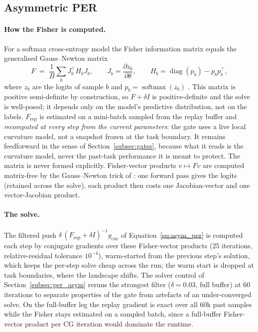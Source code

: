 \subsection{Asymmetric PER}
\label{app:impl_per}

\paragraph{How the Fisher is computed.} For a softmax cross-entropy model the Fisher information matrix equals the generalised Gauss--Newton matrix
\begin{equation*}
    F \;=\; \frac{1}{B} \sum_b J_b^\top H_b J_b,
    \qquad J_b = \frac{\partial z_b}{\partial \theta},
    \qquad H_b = \operatorname{diag}(p_b) - p_b p_b^\top,
\end{equation*}
where $z_b$ are the logits of sample $b$ and $p_b = \operatorname{softmax}(z_b)$ \citep{martens2020insights}. This matrix is positive semi-definite by construction, so $F + \delta I$ is positive-definite and the solve is well-posed; it depends only on the model's predictive distribution, not on the labels. $F_{\text{rep}}$ is estimated on a mini-batch sampled from the replay buffer and \emph{recomputed at every step from the current parameters}: the gate uses a live local curvature model, not a snapshot frozen at the task boundary. It remains feedforward in the sense of Section~\ref{subsec:gates}, because what it reads is the curvature model, never the past-task performance it is meant to protect. The matrix is never formed explicitly. Fisher-vector products $v \mapsto F v$ are computed matrix-free by the Gauss--Newton trick of \citet{schraudolph2002fast}: one forward pass gives the logits (retained across the solve), each product then costs one Jacobian-vector and one vector-Jacobian product.

\paragraph{The solve.} The filtered push $\delta\,(F_{\text{rep}}+\delta I)^{-1} g_{\text{cur}}$ of Equation~\eqref{eq:asym_per} is computed each step by conjugate gradients over these Fisher-vector products ($25$ iterations, relative-residual tolerance $10^{-4}$), warm-started from the previous step's solution, which keeps the per-step solve cheap across the run; the warm start is dropped at task boundaries, where the landscape shifts. The solver control of Section~\ref{subsec:per_asym} reruns the strongest filter ($\delta = 0.03$, full buffer) at $60$ iterations to separate properties of the gate from artefacts of an under-converged solve. On the full-buffer leg the replay gradient is exact over all $60$k past samples while the Fisher stays estimated on a sampled batch, since a full-buffer Fisher-vector product per CG iteration would dominate the runtime.

